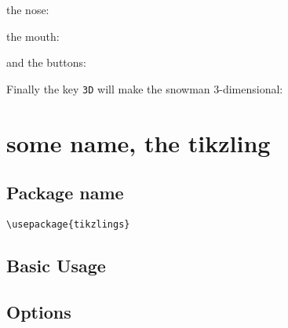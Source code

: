 \documentclass[parskip=half]{scrartcl}
\begin{document}
\begin{tcblisting}{}
\snowman[eye=red]
\end{tcblisting}

the nose:

\begin{tcblisting}{}
\snowman[nose=red]
\end{tcblisting}

the mouth:

\begin{tcblisting}{}
\snowman[mouth=red]
\end{tcblisting}

and the buttons:

\begin{tcblisting}{}
\snowman[buttons=red]
\end{tcblisting}

Finally the key \lstinline|3D| will make the snowman 3-dimensional:

\begin{tcblisting}{}
\snowman[3D]
\end{tcblisting}

\clearpage
\section[Ti\emph{k}Zlings]{some name, the tikzling}

\subsection{Package name}

\begin{tcolorbox}[lower separated=false, lefthand width=.8\linewidth]
\vspace*{0.5cm}
\lstinline|\usepackage{tikzlings}|
\vspace*{0.5cm}
\end{tcolorbox}

\subsection{Basic Usage}

\begin{tcblisting}{}
\tikzling
\end{tcblisting}

\subsection{Options}
\end{document}
